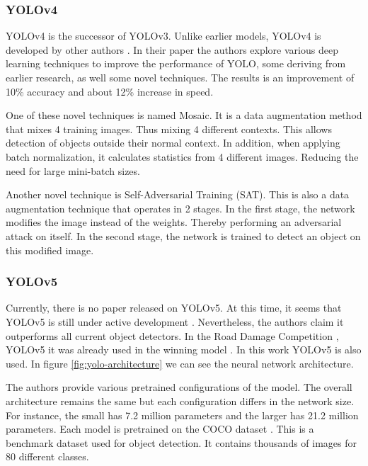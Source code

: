 \subsubsection{YOLOv4}

YOLOv4 is the successor of YOLOv3. Unlike earlier models, YOLOv4 is developed by other authors . In their paper the authors explore various deep learning techniques to improve the performance of YOLO, some deriving from earlier research, as well some novel techniques. The results is an improvement of 10\% accuracy and about 12\% increase in speed.

One of these novel techniques is named Mosaic. It is a data augmentation method that mixes 4 training images. Thus mixing 4 different contexts. This allows detection of objects outside their normal context. In addition, when applying batch normalization, it calculates statistics from 4 different images. Reducing the need for large mini-batch sizes.

Another novel technique is Self-Adversarial Training (SAT). This is also a data augmentation technique that operates in 2 stages. In the first stage, the network modifies the image instead of the weights. Thereby performing an adversarial attack on itself. In the second stage, the network is trained to detect an object on this modified image.


\subsubsection{YOLOv5}
Currently, there is no paper released on YOLOv5. At this time, it seems that YOLOv5 is still under active development \cite{Jocher2021}. Nevertheless, the authors claim it outperforms all current object detectors. In the Road Damage Competition \cite{Arya2020-competition}, YOLOv5 it was already used in the winning model \cite{rddc2020}. In this work YOLOv5 is also used. In figure \ref{fig:yolo-architecture} we can see the neural network architecture. 

The authors provide various pretrained configurations of the model. The overall architecture remains the same but each configuration differs in the network size. For instance, the small  has 7.2 million parameters and the larger  has 21.2 million parameters. Each model is pretrained on the COCO dataset \cite{COCO}. This is a benchmark dataset used for object detection. It contains thousands of images for 80 different classes.

